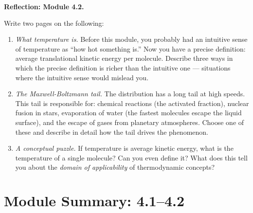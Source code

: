 \documentclass[12pt, a4paper, twoside]{book}
\begin{document}
\begin{reflectionbox}
\textbf{Reflection: Module 4.2.}

Write two pages on the following:

\begin{enumerate}[leftmargin=2em,itemsep=6pt]
  \item \textit{What temperature is.} Before this module, you probably had an intuitive sense of temperature as ``how hot something is.'' Now you have a precise definition: average translational kinetic energy per molecule. Describe three ways in which the precise definition is richer than the intuitive one --- situations where the intuitive sense would mislead you.

  \item \textit{The Maxwell-Boltzmann tail.} The distribution has a long tail at high speeds. This tail is responsible for: chemical reactions (the activated fraction), nuclear fusion in stars, evaporation of water (the fastest molecules escape the liquid surface), and the escape of gases from planetary atmospheres. Choose one of these and describe in detail how the tail drives the phenomenon.

  \item \textit{A conceptual puzzle.} If temperature is average kinetic energy, what is the temperature of a single molecule? Can you even define it? What does this tell you about the \textit{domain of applicability} of thermodynamic concepts?
\end{enumerate}
\end{reflectionbox}

\chapter*{Module Summary: 4.1--4.2}
\end{document}
